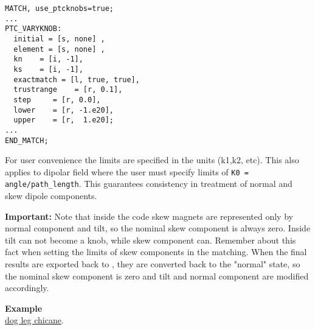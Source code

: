 \begin{verbatim}
MATCH, use_ptcknobs=true;
...
PTC_VARYKNOB: 
  initial = [s, none] , 
  element = [s, none] , 
  kn    = [i, -1], 
  ks    = [i, -1], 
  exactmatch = [l, true, true], 
  trustrange    = [r, 0.1],  
  step     = [r, 0.0], 
  lower    = [r, -1.e20],
  upper    = [r,  1.e20]; 
...
END_MATCH;
\end{verbatim}

For user convenience the limits are specified in the \madx units (k1,k2,
etc). This also applies to dipolar field where the user must specify
limits of \texttt{K0 = angle/path\_length}. This guarantees consistency in
treatment of normal and skew dipole components.   

\textbf{Important:} Note that inside the code skew magnets are represented
only by normal component and tilt, so the nominal skew component is
always zero.  Inside \ptc tilt can not become a knob, while skew
component can.  Remember about this fact when setting the limits of skew
components in the matching.  When the final results are exported back to
\madx, they are converted back to the "normal" state, so the nominal
skew component is zero and tilt and normal component are modified
accordingly.

\textbf{Example}\\
\href{http://cern.ch/frs/mad-X_examples/ptc_madx_interface/matchknobs/.madx}{dog leg chicane}.

